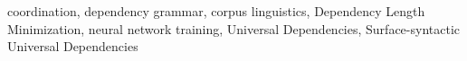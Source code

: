 coordination, dependency grammar, corpus linguistics, Dependency Length Minimization, neural network training, Universal Dependencies, Surface\hyp{}syntactic Universal Dependencies